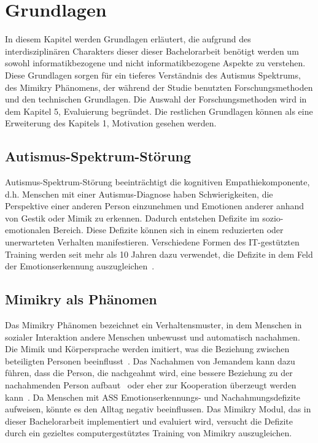 \section{Grundlagen}
In diesem Kapitel werden Grundlagen erläutert, die aufgrund des interdisziplinären Charakters dieser dieser Bachelorarbeit benötigt werden um sowohl informatikbezogene und nicht informatikbezogene Aspekte zu verstehen. Diese Grundlagen sorgen für ein tieferes Verständnis des Autismus Spektrums, des Mimikry Phänomens, der während der Studie benutzten Forschungsmethoden und den technischen Grundlagen. Die Auswahl der Forschungsmethoden wird in dem Kapitel 5, Evaluierung begründet. Die restlichen Grundlagen können als eine Erweiterung des Kapitels 1, Motivation gesehen werden. 

\subsection{Autismus-Spektrum-Störung}
Autismus-Spektrum-Störung beeinträchtigt die kognitiven Empathiekomponente, d.h. Menschen mit einer Autismus-Diagnose haben Schwierigkeiten, die Perspektive einer anderen Person einzunehmen und Emotionen anderer anhand von Gestik oder Mimik zu erkennen. Dadurch entstehen Defizite im sozio-emotionalen Bereich. Diese Defizite können sich in einem reduzierten oder unerwarteten Verhalten manifestieren. Verschiedene Formen des IT-gestützten Training werden seit mehr als 10 Jahren dazu verwendet, die Defizite in dem Feld der Emotionserkennung auszugleichen~\cite{ZirkusDelfi}.

\subsection{Mimikry als Phänomen}
Das Mimikry Phänomen bezeichnet ein Verhaltensmuster, in dem Menschen in sozialer Interaktion andere Menschen unbewusst und automatisch nachahmen. Die Mimik und Körpersprache werden imitiert, was die Beziehung zwischen beteiligten Personen beeinflusst~\cite{Di01}. Das Nachahmen von Jemandem kann dazu führen, dass die Person, die nachgeahmt wird, eine bessere Beziehung zu der nachahmenden Person aufbaut~\cite{Ch02} oder eher zur Kooperation überzeugt werden kann~\cite{Sw03}. Da Menschen mit ASS Emotionserkennungs- und Nachahmungsdefizite aufweisen, könnte es den Alltag negativ beeinflussen. Das Mimikry Modul, das in dieser Bachelorarbeit implementiert und evaluiert wird, versucht die Defizite durch ein gezieltes computergestütztes Training von Mimikry auszugleichen.

